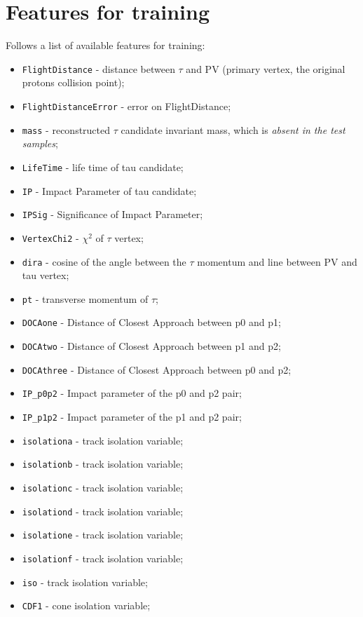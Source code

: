 \documentclass[conference]{IEEEtran}
\begin{document}
\section{Features for training}
\label{sec:features}
Follows a list of available features for training:
\begin{itemize}
	\item \texttt{FlightDistance} - distance between $\tau$ and PV (primary vertex, the
	original protons collision point);
	\item \texttt{FlightDistanceError} - error on FlightDistance;
	\item \texttt{mass} - reconstructed $\tau$ candidate invariant mass, which
	is \textit{absent in the test samples};
	\item \texttt{LifeTime} - life time of tau candidate;
	\item \texttt{IP} - Impact Parameter of tau candidate;
	\item \texttt{IPSig} - Significance of Impact Parameter;
	\item \texttt{VertexChi2} - $\chi^2$ of $\tau$ vertex;
	\item \texttt{dira} - cosine of the angle between the $\tau$ momentum and line
	between PV and tau vertex;
	\item \texttt{pt} - transverse momentum of $\tau$;
	\item \texttt{DOCAone} - Distance of Closest Approach between p0 and p1;
	\item \texttt{DOCAtwo} - Distance of Closest Approach between p1 and p2;
	\item \texttt{DOCAthree} - Distance of Closest Approach between p0 and p2;
	\item \texttt{IP\_p0p2} - Impact parameter of the p0 and p2 pair;
	\item \texttt{IP\_p1p2} - Impact parameter of the p1 and p2 pair;
	\item \texttt{isolationa} - track isolation variable;
	\item \texttt{isolationb} - track isolation variable;
	\item \texttt{isolationc} - track isolation variable;
	\item \texttt{isolationd} - track isolation variable;
	\item \texttt{isolatione} - track isolation variable;
	\item \texttt{isolationf} - track isolation variable;
	\item \texttt{iso} - track isolation variable;
	\item \texttt{CDF1} - cone isolation variable;

\end{itemize}
\end{document}
